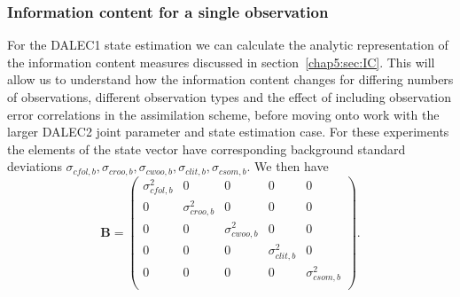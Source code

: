 \subsubsection{Information content for a single observation} \label{chap5:sec:info_con_single_time}

For the DALEC1 state estimation we can calculate the analytic representation of the information content measures discussed in section~\ref{chap5:sec:IC}. This will allow us to understand how the information content changes for differing numbers of observations, different observation types and the effect of including observation error correlations in the assimilation scheme, before moving onto work with the larger DALEC2 joint parameter and state estimation case. For these experiments the elements of the state vector have corresponding background standard deviations $ \sigma_{cfol, b}, \sigma_{croo, b}, \sigma_{cwoo, b}, \sigma_{clit, b}, \sigma_{csom, b}$. We then have
\begin{equation}
\textbf{B} = \begin{pmatrix} 
\sigma_{cfol,b}^{2} & 0 & 0 & 0 & 0 \\
0 & \sigma_{croo,b}^{2} & 0 & 0 & 0 \\
0 & 0 & \sigma_{cwoo,b}^{2} & 0 & 0 \\
0 & 0 & 0 & \sigma_{clit,b}^{2} & 0 \\
0 & 0 & 0 & 0 & \sigma_{csom,b}^{2} \\
\end{pmatrix}. \label{chap5:eqn:BmatD1}
\end{equation}   


